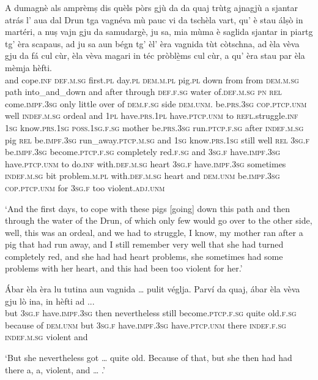 \begin{linenumbers}
\gll    A dumagnè als amprèmṣ dis quèls pòrs gjù da da quaj trùtg ajnagjù a sjantar atrás l’ aua dal Drun tga vagnéva mù pauc vi da tschèla vart, qu’ è stau álṣò in martéri, a nuṣ vajn gju da samudargè, ju sa, mia mùma è saglida sjantar in piartg tg’ èra scapaus, ad ju sa aun bégn tg’ èl’ èra vagnida tùt còtschna, ad èla vèva gju da fá cul cùr, èla vèva magari in téc pròblè̱ms cul cùr, a qu’ èra stau par èla mèmja hèfti.\\
and cope.\textsc{inf} \textsc{def.m.sg} first.\textsc{pl}  day.\textsc{pl} \textsc{dem.m.pl}  pig.\textsc{pl} down from from \textsc{dem.m.sg} path into\_and\_down and after through  \textsc{def.f.sg} water of.\textsc{def.m.sg}  \textsc{pn} \textsc{rel} come.\textsc{impf.3sg} only little over of \textsc{dem.f.sg} side \textsc{dem.unm.} be.\textsc{prs.3sg} \textsc{cop.ptcp.unm} well \textsc{indef.m.sg} ordeal and \textsc{1pl} have.\textsc{prs.1pl} have.\textsc{ptcp.unm} to  \textsc{refl.}struggle.\textsc{inf} \textsc{1sg} know.\textsc{prs.1sg} \textsc{poss.1sg.f.sg} mother be.\textsc{prs.3sg} run.\textsc{ptcp.f.sg} after \textsc{indef.m.sg} pig \textsc{rel} be.\textsc{impf.3sg} run\_away.\textsc{ptcp.m.sg} and \textsc{1sg} know.\textsc{prs.1sg} still well \textsc{rel} \textsc{3sg.f} be.\textsc{impf.3sg} become.\textsc{ptcp.f.sg} completely red.\textsc{f.sg} and \textsc{3sg.f} have.\textsc{impf.3sg} have.\textsc{ptcp.unm} to do.\textsc{inf} with.\textsc{def.m.sg} heart \textsc{3sg.f} have.\textsc{impf.3sg} sometimes \textsc{indef.m.sg} bit problem.\textsc{m.pl} with.\textsc{def.m.sg} heart and \textsc{dem.unm}  be.\textsc{impf.3sg} \textsc{cop.ptcp.unm} for \textsc{3sg.f} too violent.\textsc{adj.unm} \\
\end{linenumbers}
\medskip
\glt `And the first days, to cope with these pigs [going] down this path and then through the water of the Drun, of which only few would go over to the other side, well, this was an ordeal, and we had to struggle, I know, my mother ran after a pig that had run away, and I still remember very well that she had turned completely red, and she had had heart problems, she sometimes had some problems with her heart, and this had been too violent for her.'
\medskip

\begin{linenumbers}
\gll    Ábar èla èra lu tutina aun vagnida … pulit véglja. Parví da quaj, ábar èla vèva gju lò ina, in hèfti ad ...\\
but \textsc{3sg.f} have.\textsc{impf.3sg} then nevertheless still become.\textsc{ptcp.f.sg} {} quite old.\textsc{f.sg} because of  \textsc{dem.unm} but \textsc{3sg.f}  have.\textsc{impf.3sg} have.\textsc{ptcp.unm} there \textsc{indef.f.sg} \textsc{indef.m.sg} violent and\\
\end{linenumbers}
\medskip
\glt `But she nevertheless got … quite old. Because of that, but she then had had there a, a, violent, and … .'
\medskip

